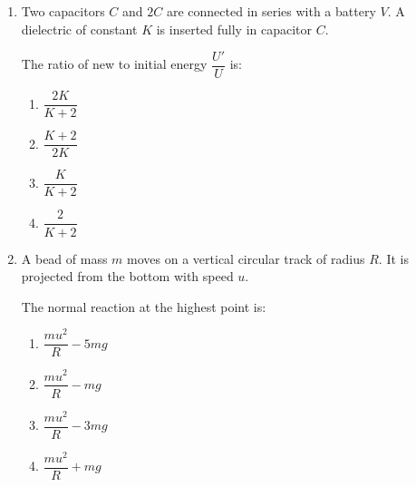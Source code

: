 \documentclass[12pt]{article}
\begin{document}
\begin{enumerate}[leftmargin=0pt,itemindent=0pt]

\item Two capacitors $C$ and $2C$ are connected in series with a battery $V$. A dielectric of constant $K$ is inserted fully in capacitor $C$.

The ratio of new to initial energy $\dfrac{U'}{U}$ is:

\begin{enumerate}
\item[(A)] $\dfrac{2K}{K+2}$
\item[(B)] $\dfrac{K+2}{2K}$
\item[(C)] $\dfrac{K}{K+2}$
\item[(D)] $\dfrac{2}{K+2}$
\end{enumerate}


\item A bead of mass $m$ moves on a vertical circular track of radius $R$. It is projected from the bottom with speed $u$.

The normal reaction at the highest point is:

\begin{center}
\end{center}
\begin{enumerate}
\item[(A)] $\dfrac{mu^2}{R}-5mg$
\item[(B)] $\dfrac{mu^2}{R}-mg$
\item[(C)] $\dfrac{mu^2}{R}-3mg$
\item[(D)] $\dfrac{mu^2}{R}+mg$
\end{enumerate}

\end{enumerate}
\end{document}
